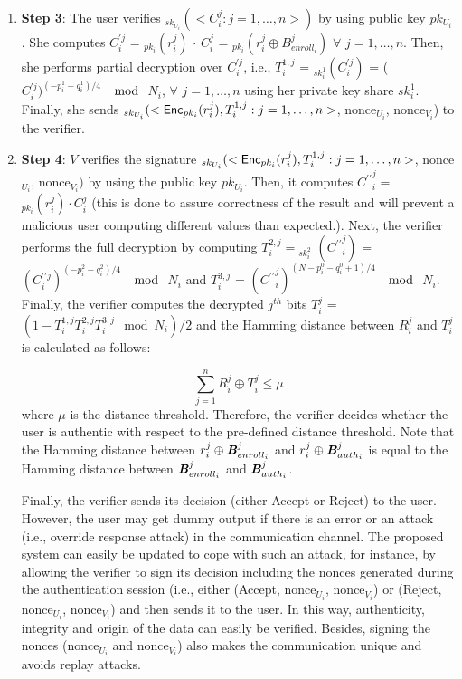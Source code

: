 \documentclass[journal]{IEEEtran}
\begin{document}
\begin{enumerate}
\item \textbf{Step 3}: The user verifies $_{sk_{U_i}}(<C^{j}_{i}:j=1,\ldots,n>)$ by using public key $pk_{U_i}$. She computes $C^{\prime j}_{i}$ = $_{pk_i}(r^{j}_{i})$ $\cdot$ $C^{j}_{i}$ = $_{pk_i}(r^{j}_{i}\oplus\textit{B}^j_{enroll_i})$ 
$\forall$ $j=1,\ldots,n$. Then, she performs partial decryption over $C^{\prime j}_{i}$, i.e., $T^{1,j}_{i}$ = $_{sk_i^1}(C^{\prime j}_{i})$ = ($C^{\prime j}_{i})^{(-p_i^1-q_i^1)/4}$ $\mod$ $N_i$, $\forall$ $j=1,\ldots,n$ using her private key share $sk_i^1$. Finally, she sends $_{sk_{U_i}}(<\text{\sf Enc}_{pk_i}(r^{j}_{i}), T^{1,j}_{i}:j=1,\ldots,n>$, nonce$_{U_i}$, nonce$_{V_i}$)  to the verifier.

\item \textbf{Step 4}: $V$ verifies the signature $_{sk_{U_i}}(<\text{\sf Enc}_{pk_i}(r^{j}_{i}), T^{1,j}_{i}:j=1,\ldots,n>$, nonce$_{U_i}$, nonce$_{V_i})$ by using the public key $pk_{U_i}$. Then, it computes ${C^{\prime\prime}}_i^j = $$_{pk_i}(r_i^j) \cdot C^{j}_{i}$ (this is done to assure correctness of the result and will prevent a malicious user computing different values than expected.). Next, the verifier performs the full decryption by computing $T^{2,j}_i= $$_{sk_i^2}$ $({C^{\prime\prime}}_i^j)$ = ${(C^{\prime\prime j}_{i})}^{(-p_i^2-q_i^2)/4}$ $\mod$ $N_i$ and $T^{3,j}_i$ = ${({C^{\prime\prime}}^{j}_{i})}^{(N-p_i^0-q_i^0+1)/4}$ $\mod$ $N_i$. Finally, the verifier computes the decrypted $j^{th}$ bits $T^{j}_{i}$ = $(1-T^{1,j}_{i}T^{2,j}_{i}T^{3,j}_{i} \mod N_i)/2$ and the Hamming distance  between $R^{j}_{i}$ and $T^{j}_{i}$ is calculated as follows:

\begin{equation}
\sum^{n}_{j=1}R^{j}_{i} \oplus T^{j}_{i} \leq \mu
\end{equation}
where $\mu$ is the distance threshold. Therefore, the verifier decides whether the user is authentic with respect to the pre-defined distance threshold. Note that the Hamming distance between $r^{j}_{i}\oplus\textbf{\textit{B}}^j_{enroll_i}$ and $r^{j}_{i}\oplus\textbf{\textit{B}}^j_{auth_i}$ is equal to the Hamming distance between $\textbf{\textit{B}}^j_{enroll_i}$ and $\textbf{\textit{B}}^j_{auth_i}$.


Finally, the verifier sends its decision (either Accept or Reject) to the user. However, the user may get dummy output if there is an error or an attack (i.e., override response attack) in the communication channel. The proposed system can easily be updated to cope with such an attack, for instance, by allowing the verifier to sign its decision including the nonces generated during the authentication session (i.e., either (Accept, nonce$_{U_i}$, nonce$_{V_i}$) or  (Reject, nonce$_{U_i}$, nonce$_{V_i}$) and then sends it to the user. In this way, authenticity, integrity and origin of the data can easily be verified. Besides, signing the nonces (nonce$_{U_i}$ and nonce$_{V_i}$)  also makes the communication unique and avoids replay attacks.

\end{enumerate}
\end{document}
